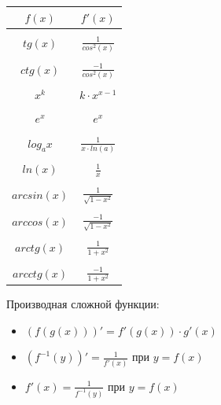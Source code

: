 \documentclass[oneside]{book}
\begin{document}
\begin{enumerate}
\begin{center}
      \begin{tabular}{c|c}
        $f(x)$ & $f'(x)$ \\
        \hline \\
        $tg(x)$ & $\frac{1}{cos^2(x)}$ \\
          \hline \\
        $ctg(x)$ & $\frac{-1}{cos^2(x)}$ \\
          \hline \\
        $x^k$ & $k \cdot x^{x-1}$ \\
          \hline \\
        $e^x$ & $e^x$ \\
          \hline \\
        $log_a x$ & $\frac{1}{x \cdot ln(a)}$ \\
          \hline \\
        $ln(x)$ & $\frac{1}{x}$ \\
          \hline \\
        $arcsin(x)$ & $\frac{1}{\sqrt{1 - x^2}}$ \\
          \hline \\
        $arccos(x)$ & $\frac{-1}{\sqrt{1 - x^2}}$ \\
          \hline \\
        $arctg(x)$ & $\frac{1}{1 + x^2}$ \\
          \hline \\
        $arcctg(x)$ & $\frac{-1}{1 + x^2}$ \\
      \end{tabular}
  \end{center}
Производная сложной функции:
\begin{itemize}
  \item $(f(g(x)))' = f'(g(x)) \cdot g'(x)$
  \item $(f^{-1}(y))' = \frac{1}{f'(x)}$ при $y = f(x)$
  \item $f'(x) = \frac{1}{f^{-1}(y)}$ при $y = f(x)$
\end{itemize}

\end{enumerate}
\end{document}
